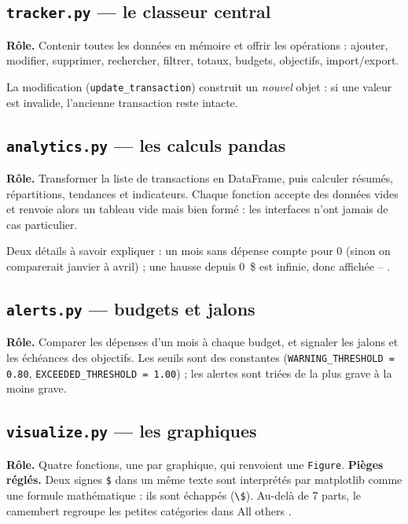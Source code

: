 \documentclass[11pt,a4paper]{article}
\newcommand{\code}[1]{{\NoAutoSpacing\texttt{#1}}}
\begin{document}
\subsection{\code{tracker.py} --- le classeur central}
\textbf{Rôle.} Contenir toutes les données en mémoire et offrir les opérations : ajouter,
modifier, supprimer, rechercher, filtrer, totaux, budgets, objectifs, import/export.


La modification (\code{update\_transaction}) construit un \emph{nouvel} objet : si une valeur
est invalide, l'ancienne transaction reste intacte.

\subsection{\code{analytics.py} --- les calculs pandas}
\textbf{Rôle.} Transformer la liste de transactions en DataFrame, puis calculer résumés,
répartitions, tendances et indicateurs. Chaque fonction accepte des données vides et renvoie
alors un tableau vide mais bien formé : les interfaces n'ont jamais de cas particulier.


Deux détails à savoir expliquer : un mois sans dépense compte pour 0 (sinon on comparerait
janvier à avril) ; une hausse depuis 0~\$ est infinie, donc affichée \og -- \fg.

\subsection{\code{alerts.py} --- budgets et jalons}
\textbf{Rôle.} Comparer les dépenses d'un mois à chaque budget, et signaler les jalons et les
échéances des objectifs. Les seuils sont des constantes (\code{WARNING\_THRESHOLD = 0.80},
\code{EXCEEDED\_THRESHOLD = 1.00}) ; les alertes sont triées de la plus grave à la moins
grave.


\subsection{\code{visualize.py} --- les graphiques}
\textbf{Rôle.} Quatre fonctions, une par graphique, qui renvoient une \code{Figure}.
\textbf{Pièges réglés.} Deux signes \code{\$} dans un même texte sont interprétés par
matplotlib comme une formule mathématique : ils sont échappés (\code{\textbackslash\$}). Au-delà
de 7 parts, le camembert regroupe les petites catégories dans \og All others \fg.

\end{document}
